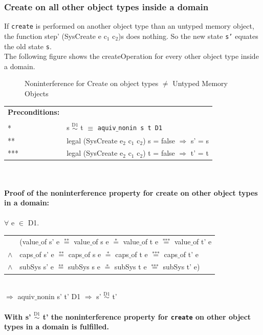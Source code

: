 \documentclass[11pt,a4paper,twoside]{article}
\begin{document}
{\subsubsection{Create on all other object types inside a domain}
If \texttt{create} is performed on another object type than an untyped memory object, the  function step' (SysCreate e c$_1$ c$_2$)s does nothing. So the new state \texttt{s'} equates the old state \texttt{s}. \\
The following figure shows the createOperation for every other object type inside a domain.
\begin{flushleft}
\begin{figure}[H]
\caption{Noninterference for Create on object types $\neq$ Untyped Memory Objects}
\end{figure}
\end{flushleft}
\begin{tabular}{ll}
\textbf{Preconditions:} \\ \\
* & s $\overset{\text{D1}}{\sim}$ t $\equiv$ \texttt{aquiv$\_$nonin s t D1}	\\ 
** & legal (SysCreate e$_2$ c$_1$ c$_2$) s = false $\Rightarrow$ s' = s \\ 
*** & legal (SysCreate e$_2$ c$_1$ c$_2$) t = false $\Rightarrow$ t' = t
\end{tabular}\\ \\ 
\textbf{Proof of the noninterference property for create on other object types in a domain:} \\ \\
$\forall$ e $\in$ D1. \\ 
\begin{tabular}{ll}
& (value$\_$of s' e $\overset{\text{**}}{=}$ value$\_$of s e $\overset{\text{*}}{=}$ value$\_$of t e $\overset{\text{***}}{=}$ value$\_$of t' e \\
$\wedge$ & caps$\_$of s' e $\overset{\text{**}}{=}$ caps$\_$of s e $\overset{\text{*}}{=}$ caps$\_$of t e $\overset{\text{***}}{=}$ caps$\_$of t' e \\
$\wedge$ & subSys s' e $\overset{\text{**}}{=}$ subSys s e $\overset{\text{*}}{=}$ subSys t e $\overset{\text{***}}{=}$ subSys t' e)
\end{tabular} \\
$\Rightarrow$ aquiv$\_$nonin s' t' D1 $\Rightarrow$ s' $\overset{\text{D1}}{\sim}$ t' \\ \\
\textbf{With s' $\overset{\text{D1}}{\sim}$ t' the noninterference property for \texttt{create} on other object types in a domain is fulfilled.} 
}
\end{document}
